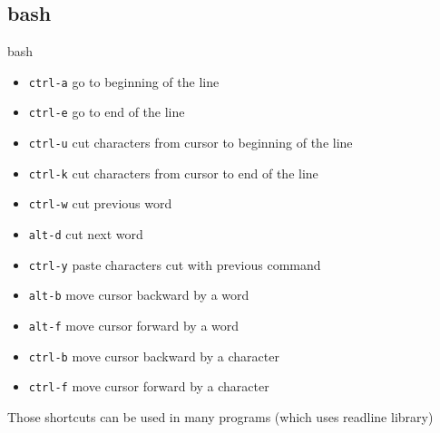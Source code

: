\subsection{bash}

\begin{frame}[fragile]{bash}
  \begin{itemize}
    \pause \item \texttt{ctrl-a} go to beginning of the line
    \pause \item \texttt{ctrl-e} go to end of the line
    \pause \item \texttt{ctrl-u} cut characters from cursor to beginning of the line
    \pause \item \texttt{ctrl-k} cut characters from cursor to end of the line
    \pause \item \texttt{ctrl-w} cut previous word
    \pause \item \texttt{alt-d} cut next word
    \pause \item \texttt{ctrl-y} paste characters cut with previous command
    \pause \item \texttt{alt-b} move cursor backward by a word
    \pause \item \texttt{alt-f} move cursor forward by a word
    \pause \item \texttt{ctrl-b} move cursor backward by a character
    \pause \item \texttt{ctrl-f} move cursor forward by a character
  \end{itemize}
\pause
Those shortcuts can be used in many programs (which uses readline library)
\end{frame}

